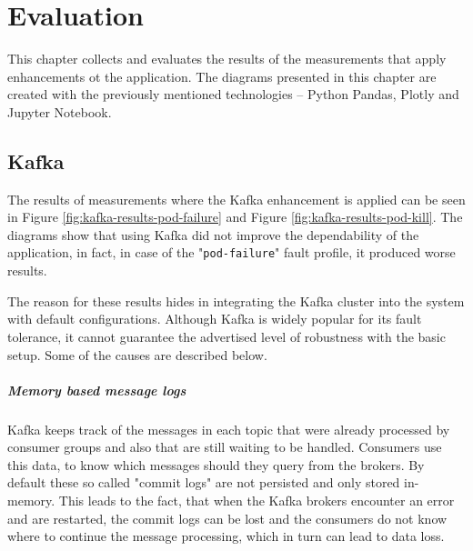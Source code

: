 \chapter{Evaluation} \label{evaluation}

This chapter collects and evaluates the results of the measurements that apply enhancements ot the application. The diagrams presented in this chapter are created with the previously mentioned technologies -- Python Pandas, Plotly and Jupyter Notebook.


\section{Kafka}

The results of measurements where the Kafka enhancement is applied can be seen in Figure \ref{fig:kafka-results-pod-failure} and Figure \ref{fig:kafka-results-pod-kill}. The diagrams show that using Kafka did not improve the dependability of the application, in fact, in case of the "\texttt{pod-failure}" fault profile, it produced worse results.

The reason for these results hides in integrating the Kafka cluster into the system with default configurations. Although Kafka is widely popular for its fault tolerance, it cannot guarantee the advertised level of robustness with the basic setup. Some of the causes are described below.

\paragraph{Memory based message logs} Kafka keeps track of the messages in each topic that were already processed by consumer groups and also that are still waiting to be handled. Consumers use this data, to know which messages should they query from the brokers. By default these so called "commit logs" are not persisted and only stored in-memory. This leads to the fact, that when the Kafka brokers encounter an error and are restarted, the commit logs can be lost and the consumers do not know where to continue the message processing, which in turn can lead to data loss.

